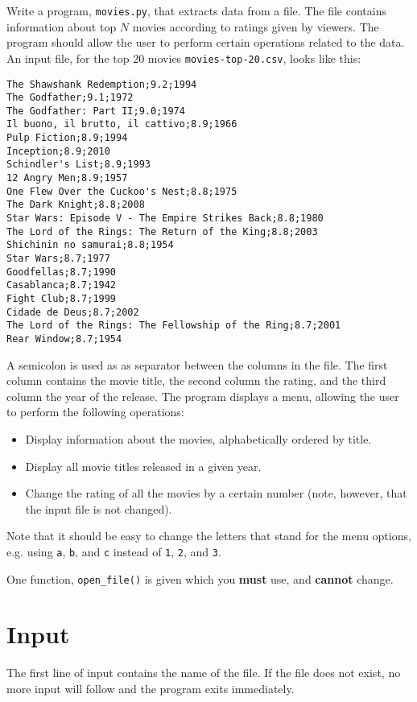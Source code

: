 
Write a program, \texttt{movies.py}, that extracts data from a file.
The file contains information about top $N$ movies according to ratings given by viewers.
The program should allow the user to perform certain operations related to the data.
An input file, for the top $20$ movies \texttt{movies-top-20.csv}, looks like this:

\begin{verbatim}
The Shawshank Redemption;9.2;1994
The Godfather;9.1;1972
The Godfather: Part II;9.0;1974
Il buono, il brutto, il cattivo;8.9;1966
Pulp Fiction;8.9;1994
Inception;8.9;2010
Schindler's List;8.9;1993
12 Angry Men;8.9;1957
One Flew Over the Cuckoo's Nest;8.8;1975
The Dark Knight;8.8;2008
Star Wars: Episode V - The Empire Strikes Back;8.8;1980
The Lord of the Rings: The Return of the King;8.8;2003
Shichinin no samurai;8.8;1954
Star Wars;8.7;1977
Goodfellas;8.7;1990
Casablanca;8.7;1942
Fight Club;8.7;1999
Cidade de Deus;8.7;2002
The Lord of the Rings: The Fellowship of the Ring;8.7;2001
Rear Window;8.7;1954
\end{verbatim}

A semicolon is used as as separator between the columns in the file.  The first column contains the movie title, the second column the rating, and the third column the year of the release.
The program displays a menu, allowing the user to perform the following operations:
\begin{itemize}
    \item Display information about the movies, alphabetically ordered by title.
    \item Display all movie titles released in a given year.
    \item Change the rating of all the movies by a certain number (note, however, that the input file is not changed).
\end{itemize}

Note that it should be easy to change the letters that stand for the menu options, e.g. using \texttt{a}, \texttt{b}, and \texttt{c} instead of \texttt{1}, \texttt{2}, and \texttt{3}.

One function, \texttt{open\_file()} is given which you \textbf{must} use, and \textbf{cannot} change.

\section*{Input}
The first line of input contains the name of the file.
If the file does not exist, no more input will follow and the program exits immediately.

